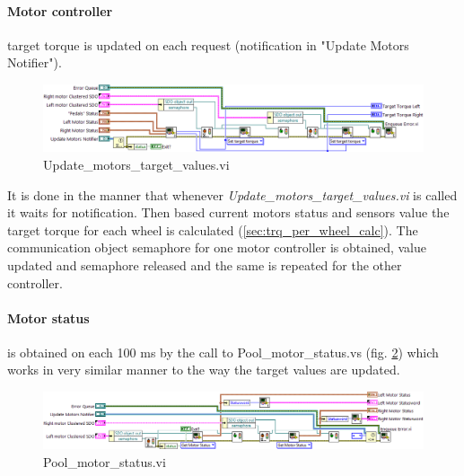 \paragraph{Motor controller} target torque is updated on each request (notification in "Update Motors Notifier"). 
\begin{figure}[H]
    \centering
    \includegraphics[scale=\visc,max width=\textwidth]{figures/Update_motors_target_valuesd}
    \caption{Update\_motors\_target\_values.vi}
    \label{vi:Update_motors_target_values}
\end{figure}
It is done in the manner that whenever \textit{Update\_motors\_target\_values.vi} is called it waits for notification. Then based current motors status and sensors value the target torque for each wheel is calculated (\ref{sec:trq_per_wheel_calc}). The communication object semaphore for one motor controller is obtained, value updated and semaphore released and the same is repeated for the other controller.


\paragraph{Motor status} is obtained on each 100 ms by the call to Pool\_motor\_status.vs (fig. \ref{vi:Pool_motor_statusd}) which works in very similar manner to the way the target values are updated.
\begin{figure}[H]
    \centering
    \includegraphics[scale=\visc,max width=\textwidth]{figures/Pool_motor_statusd}
    \caption{Pool\_motor\_status.vi}
    \label{vi:Pool_motor_statusd}
\end{figure}

